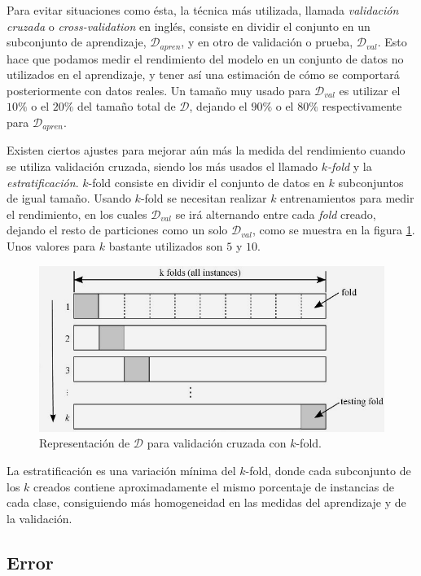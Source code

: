 Para evitar situaciones como ésta, la técnica más utilizada, llamada \emph{validación cruzada} o \emph{cross-validation} en inglés, consiste en dividir el conjunto en un subconjunto de aprendizaje, $\mathcal{D}_{apren}$, y en otro de validación o prueba, $\mathcal{D}_{val}$. Esto hace que podamos medir el rendimiento del modelo en un conjunto de datos no utilizados en el aprendizaje, y tener así una estimación de cómo se comportará posteriormente con datos reales. Un tamaño muy usado para $\mathcal{D}_{val}$ es utilizar el $10\%$ o el $20\%$ del tamaño total de $\mathcal{D}$, dejando el $90\%$ o el $80\%$ respectivamente para $\mathcal{D}_{apren}$. 

Existen ciertos ajustes para mejorar aún más la medida del rendimiento cuando se utiliza validación cruzada, siendo los más usados el llamado \emph{$k$-fold} y la \emph{estratificación}. $k$-fold consiste en dividir el conjunto de datos en $k$ subconjuntos de igual tamaño. Usando $k$-fold se necesitan realizar $k$ entrenamientos para medir el rendimiento, en los cuales $\mathcal{D}_{val}$ se irá alternando entre cada \emph{fold} creado, dejando el resto de particiones como un solo $\mathcal{D}_{val}$, como se muestra en la figura \ref{fig:3.7}. Unos valores para $k$ bastante utilizados son $5$ y $10$.

\begin{figure}[H]
  \centering
  \includegraphics[width=120mm]{figures/ch_03/k_fold_example.jpg}
  \caption{Representación de $\mathcal{D}$ para validación cruzada con $k$-fold. \cite{ekroth2012intro}}
  \label{fig:3.7}
\end{figure}

La estratificación es una variación mínima del $k$-fold, donde cada subconjunto de los $k$ creados contiene aproximadamente el mismo porcentaje de instancias de cada clase, consiguiendo más homogeneidad en las medidas del aprendizaje y de la validación.

\subsection{Error} \label{subsec:3.2.3}

